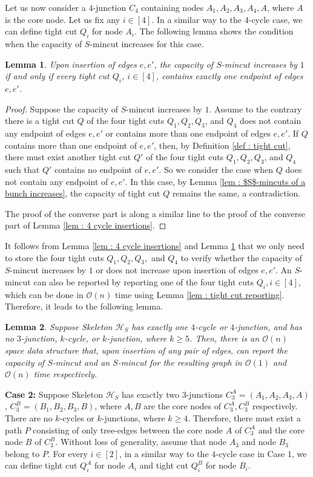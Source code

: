 \documentclass[letterpaper,11pt]{article}
\newtheorem{lemma}{Lemma}[]
\begin{document}
Let us now consider a $4$-junction $C_4$ containing nodes $A_1,A_2,A_3,A_4,A$, where $A$ is the core node. Let us fix any $i\in[4]$. In a similar way to the $4$-cycle case, we can define tight cut $Q_i$ for node $A_i$. The following lemma shows the condition when the capacity of $S$-mincut increases for this case.
\begin{lemma} \label{lem : 4 junction insertions}
    Upon insertion of edges $e,e'$, the capacity of $S$-mincut increases by $1$ if and only if every tight cut $Q_i$, $i\in [4]$, contains exactly one endpoint of edges $e,e'$.
\end{lemma}
\begin{proof}
    Suppose the capacity of $S$-mincut increases by $1$. Assume to the contrary there is a tight cut $Q$ of the four tight cuts $Q_1,Q_2,Q_3$, and $Q_4$ does not contain any endpoint of edges $e,e'$ or contains more than one endpoint of edges $e,e'$. If $Q$ contains more than one endpoint of $e,e'$, then, by Definition \ref{def : tight cut}, there must exist another tight cut $Q'$ of the four tight cuts $Q_1,Q_2,Q_3$, and $Q_4$ such that $Q'$ contains no endpoint of $e,e'$. So we consider the case when $Q$ does not contain any endpoint of $e,e'$. In this case, by Lemma \ref{lem : $S$-mincuts of a bunch increases}, the capacity of tight cut $Q$ remains the same, a contradiction.  

    The proof of the converse part is along a similar line to the proof of the converse part of Lemma \ref{lem : 4 cycle insertions}. 
\end{proof}
It follows from Lemma \ref{lem : 4 cycle insertions} and Lemma \ref{lem : 4 junction insertions} that we only need to store the four tight cuts $Q_1,Q_2,Q_3,$ and $Q_4$ to verify whether the capacity of $S$-mincut increases by $1$ or does not increase upon insertion of edges $e,e'$. An $S$-mincut can also be reported by reporting one of the four tight cuts $Q_i, i\in [4]$, which can be done in ${\mathcal O}(n)$ time using Lemma \ref{lem : tight cut reporting}. Therefore, it leads to the following lemma.
\begin{lemma} \label{lem : 4-junction or 4-cycles}
    Suppose Skeleton ${\mathcal H}_S$ has exactly one $4$-cycle or $4$-junction, and has no $3$-junction, $k$-cycle, or $k$-junction, where $k\ge 5$. Then, there is an ${\mathcal O}(n)$ space data structure that, upon insertion of any pair of edges, can report the capacity of $S$-mincut and an $S$-mincut for the resulting graph in ${\mathcal O}(1)$ and ${\mathcal O}(n)$ time respectively.
\end{lemma}
\noindent
\textbf{Case 2:} Suppose Skeleton ${\mathcal H}_S$ has exactly two $3$-junctions $C_3^A=(A_1,A_2,A_3,A)$, $C_3^B=(B_1,B_2,B_3,B)$, where $A,B$ are the core nodes of $C_3^A,C_3^B$ respectively. There are no $k$-cycles or $k$-junctions, where $k\ge 4$. Therefore, there must exist a path $P$ consisting of only tree-edges between the core node $A$ of $C_3^A$ and the core node $B$ of $C_3^B$. Without loss of generality, assume that node $A_3$ and node $B_3$ belong to $P$. For every $i\in [2]$, in a similar way to the $4$-cycle case in Case 1, we can define tight cut $Q_i^A$ for node $A_i$ and tight cut $Q_i^B$ for node $B_i$.
\end{document}
